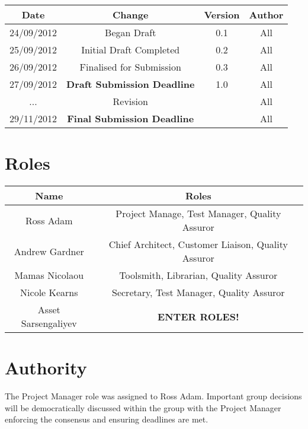 \documentclass{l3deliverable}
\begin{document}
\begin{center}{
\begin{tabular}{|c|c|c|c|}
\hline \textbf{Date} &\textbf{Change} & \textbf{Version} & \textbf{Author}\\ 
\hline 24/09/2012 & Began Draft & 0.1 & All \\ 
\hline 25/09/2012 & Initial Draft Completed & 0.2 & All \\ 
\hline 26/09/2012 & Finalised for Submission & 0.3 & All\\ 
\hline 27/09/2012 & \textbf{Draft Submission Deadline} & 1.0 & All\\ 
\hline ... & Revision & & All\\ 
\hline 29/11/2012 & \textbf{Final Submission Deadline} & & All\\ 
\hline 
\end{tabular} }
\end{center}


\section{Roles}

\begin{center}{
\begin{tabular}{|c|c|}
\hline \textbf{Name} &\textbf{Roles}\\ 
\hline Ross Adam & Project Manage, Test Manager, Quality Assuror\\ 
\hline Andrew Gardner & Chief Architect, Customer Liaison, Quality Assuror  \\ 
\hline Mamas Nicolaou & Toolsmith, Librarian, Quality Assuror\\ 
\hline Nicole Kearns & Secretary, Test Manager, Quality Assuror\\ 
\hline Asset Sarsengaliyev & \textbf{ENTER ROLES!}\\
\hline 
\end{tabular} }
\end{center}

\section{Authority}

The Project Manager role was assigned to Ross Adam. Important group decisions will be democratically
discussed within the group with the Project Manager enforcing the consensus and ensuring
deadlines are met.
\end{document}
